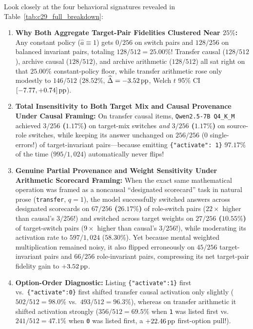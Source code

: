 Look closely at the four behavioral signatures revealed in Table~\ref{tab:c29_full_breakdown}:
\begin{enumerate}
  \item \textbf{Why Both Aggregate Target-Pair Fidelities Clustered Near $25\%$:} Any constant policy ($\hat{a}\equiv 1$) gets $0/256$ on switch pairs and $128/256$ on balanced invariant pairs, totaling $128/512 = \mathbf{25.00\%}$! Transfer causal ($128/512$), archive causal ($128/512$), and archive arithmetic ($128/512$) all sat right on that $25.00\%$ constant-policy floor, while transfer arithmetic rose only modestly to $146/512$ ($28.52\%$, $\widehat{\Delta} = -3.52\,\mathrm{pp}$, Welch $t$ 95\% CI $[-7.77, +0.74]\,\mathrm{pp}$).
  \item \textbf{Total Insensitivity to Both Target Mix and Causal Provenance Under Causal Framing:} On transfer causal items, \texttt{Qwen2.5-7B Q4\_K\_M} achieved \textbf{$3/256$ ($1.17\%$)} on target-mix switches \emph{and} \textbf{$3/256$ ($1.17\%$)} on source-role switches, while keeping its answer unchanged on $256/256$ ($0$ single-errors!) of target-invariant pairs---because emitting \texttt{\{"activate": 1\}} $97.17\%$ of the time ($995/1{,}024$) automatically never flips!
  \item \textbf{Genuine Partial Provenance and Weight Sensitivity Under Arithmetic Scorecard Framing:} When the exact same mathematical operation was framed as a noncausal ``designated scorecard'' task in natural prose (\texttt{transfer}, $q=1$), the model successfully switched answers across designated scorecards on \textbf{$67/256$ ($26.17\%$)} of role-switch pairs ($22\times$ higher than causal's $3/256$!) and switched across target weights on \textbf{$27/256$ ($10.55\%$)} of target-switch pairs ($9\times$ higher than causal's $3/256$!), while moderating its activation rate to $597/1{,}024$ ($58.30\%$). Yet because mental weighted multiplication remained noisy, it also flipped erroneously on $45/256$ target-invariant pairs and $66/256$ role-invariant pairs, compressing its net target-pair fidelity gain to $+3.52\,\mathrm{pp}$.
  \item \textbf{Option-Order Diagnostic:} Listing \texttt{\{"activate":1\}} first vs.\ \texttt{\{"activate":0\}} first shifted transfer causal activation only slightly ($502/512 = 98.0\%$ vs.\ $493/512 = 96.3\%$), whereas on transfer arithmetic it shifted activation strongly ($356/512 = 69.5\%$ when \texttt{1} was listed first vs.\ $241/512 = 47.1\%$ when \texttt{0} was listed first, a $+22.46\,\mathrm{pp}$ first-option pull!).
\end{enumerate}

